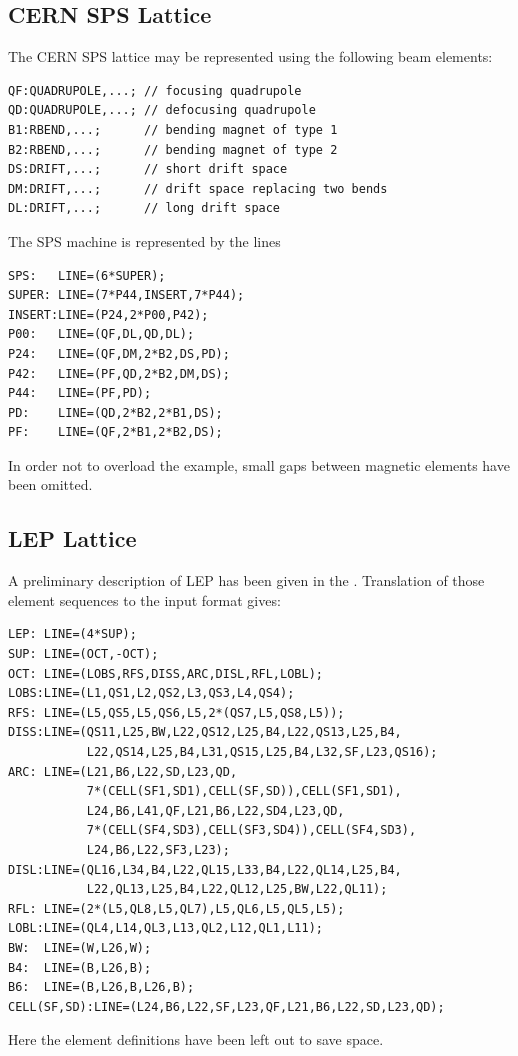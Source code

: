 \clearpage
\subsection{CERN SPS Lattice}
\label{sec:sps}
The CERN SPS lattice may be represented using the following beam elements:
\begin{verbatim}
QF:QUADRUPOLE,...; // focusing quadrupole
QD:QUADRUPOLE,...; // defocusing quadrupole
B1:RBEND,...;      // bending magnet of type 1
B2:RBEND,...;      // bending magnet of type 2
DS:DRIFT,...;      // short drift space
DM:DRIFT,...;      // drift space replacing two bends
DL:DRIFT,...;      // long drift space
\end{verbatim}
The SPS machine is represented by the lines
\begin{verbatim}
SPS:   LINE=(6*SUPER);
SUPER: LINE=(7*P44,INSERT,7*P44);
INSERT:LINE=(P24,2*P00,P42);
P00:   LINE=(QF,DL,QD,DL);
P24:   LINE=(QF,DM,2*B2,DS,PD);
P42:   LINE=(PF,QD,2*B2,DM,DS);
P44:   LINE=(PF,PD);
PD:    LINE=(QD,2*B2,2*B1,DS);
PF:    LINE=(QF,2*B1,2*B2,DS);
\end{verbatim}
In order not to overload the example,
small gaps between magnetic elements have been omitted.

\subsection{LEP Lattice}
\label{sec:lep}
A preliminary description of LEP has been given in the
.
Translation of those element sequences to the \opal input format gives:
\begin{verbatim}
LEP: LINE=(4*SUP);
SUP: LINE=(OCT,-OCT);
OCT: LINE=(LOBS,RFS,DISS,ARC,DISL,RFL,LOBL);
LOBS:LINE=(L1,QS1,L2,QS2,L3,QS3,L4,QS4);
RFS: LINE=(L5,QS5,L5,QS6,L5,2*(QS7,L5,QS8,L5));
DISS:LINE=(QS11,L25,BW,L22,QS12,L25,B4,L22,QS13,L25,B4,
           L22,QS14,L25,B4,L31,QS15,L25,B4,L32,SF,L23,QS16);
ARC: LINE=(L21,B6,L22,SD,L23,QD,
           7*(CELL(SF1,SD1),CELL(SF,SD)),CELL(SF1,SD1),
           L24,B6,L41,QF,L21,B6,L22,SD4,L23,QD,
           7*(CELL(SF4,SD3),CELL(SF3,SD4)),CELL(SF4,SD3),
           L24,B6,L22,SF3,L23);
DISL:LINE=(QL16,L34,B4,L22,QL15,L33,B4,L22,QL14,L25,B4,
           L22,QL13,L25,B4,L22,QL12,L25,BW,L22,QL11);
RFL: LINE=(2*(L5,QL8,L5,QL7),L5,QL6,L5,QL5,L5);
LOBL:LINE=(QL4,L14,QL3,L13,QL2,L12,QL1,L11);
BW:  LINE=(W,L26,W);
B4:  LINE=(B,L26,B);
B6:  LINE=(B,L26,B,L26,B);
CELL(SF,SD):LINE=(L24,B6,L22,SF,L23,QF,L21,B6,L22,SD,L23,QD);
\end{verbatim}
Here the element definitions have been left out to save space.
